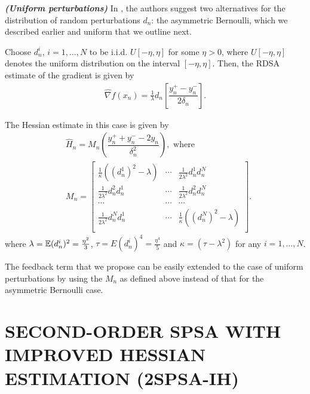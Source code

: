 \documentclass[twocolumn]{IEEEtran}
\begin{document}
\begin{remark}\textbf{\textit{(Uniform perturbations)}}
\label{remark:unif}
In \cite{prashanth2015rdsa}, the authors suggest two alternatives for the distribution of random perturbations $d_n$: the asymmetric Bernoulli, which we described earlier and uniform that we outline next.

Choose $d_n^i$, $ i=1,\ldots,N$ to be i.i.d. $U[-\eta,\eta]$ for some $\eta>0$, where $U[-\eta,\eta]$ denotes the uniform distribution on the interval $[-\eta,\eta]$.
Then, the RDSA estimate of the gradient is given by
\begin{align}
\label{eq:grad-unif}
\widehat\nabla f(x_n) = \frac1{\lambda} d_n \left[ \dfrac{y_n^+ - y_n^-}{2\delta_n}\right].
\end{align}

The Hessian estimate in this case is given by
\begin{align}
\label{eq:2rdsa-estimate-unif}
&\widehat H_n =  M_n \left(\dfrac{y_n^+ + y_n^- - 2 y_n}{\delta_n^2}\right), \text{ where } \\
& M_n =
\left[
\begin{array}{cccc}
\frac{1}{\kappa}\left((d_n^1)^2-\lambda\right) & \cdots &\frac{1}{2 \lambda^2} d_n^1 d_n^N\\
\frac{1}{2 \lambda^2} d_n^2 d_n^1  &  \cdots & \frac{1}{2 \lambda^2} d_n^2 d_n^N\\
\cdots&\cdots&\cdots\\
\frac{1}{2 \lambda^2} d_n^N d_n^1 & \cdots &  \frac{1}{\kappa}\left((d_n^N)^2-\lambda\right) \\
\end{array}
\right].\nonumber
\end{align}
where $\lambda = \mathbb{E}(d_n^i)^2 = \frac{\eta^2}{3}$, $\tau = E (d_n^i)^4= \frac{\eta^4}{5}$ and $\kappa = \left(\tau - \lambda^2\right)$ for any $i=1,\ldots,N$. 


The feedback term that we propose can be easily extended to the case of uniform perturbations by using the $M_n$ as defined above instead of that for the asymmetric Bernoulli case.
\end{remark}


\section{SECOND-ORDER SPSA WITH IMPROVED HESSIAN ESTIMATION (2SPSA-IH)}
\end{document}
